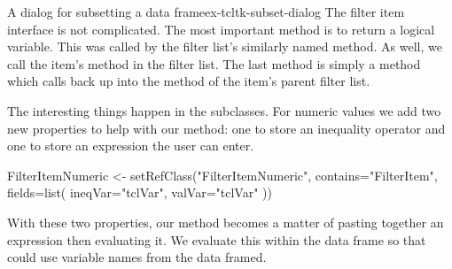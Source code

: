 \begin{example}{A dialog for subsetting a data frame}{ex-tcltk-subset-dialog}
The filter item interface is not complicated. The most important method
is  to return a logical variable. This was called by
the filter list's similarly named  method. As well,
we call the item's  method in the filter list. The
last method is simply a  method which calls back up into the
 method of the item's parent filter list.

\begin{Schunk}
\end{Schunk}

The interesting things happen in the subclasses. For numeric values we
add two new properties to help with our  method: one
to store an inequality operator and one to store an expression the
user can enter.
\begin{Schunk}
\begin{Sinput}
 FilterItemNumeric <- setRefClass("FilterItemNumeric",
                                  contains="FilterItem",
                                  fields=list(
                                    ineqVar="tclVar",
                                    valVar="tclVar"
                                    ))
\end{Sinput}
\end{Schunk}
%

With these two properties, our  method becomes a
matter of pasting together an expression then evaluating it. We
evaluate this within the data frame so that  could use
variable names from the data framed. 
\begin{Schunk}
\end{Schunk}
\end{example}
